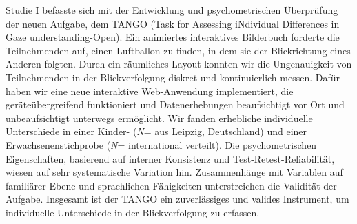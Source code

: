 \documentclass[
]{scrbook}
\begin{document}
Studie I befasste sich mit der Entwicklung und psychometrischen Überprüfung der neuen Aufgabe, dem TANGO (Task for Assessing iNdividual Differences in Gaze understanding-Open). Ein animiertes interaktives Bilderbuch forderte die Teilnehmenden auf, einen Luftballon zu finden, in dem sie der Blickrichtung eines Anderen folgten. Durch ein räumliches Layout konnten wir die Ungenauigkeit von Teilnehmenden in der Blickverfolgung diskret und kontinuierlich messen. Dafür haben wir eine neue interaktive Web-Anwendung implementiert, die geräteübergreifend funktioniert und Datenerhebungen beaufsichtigt vor Ort und unbeaufsichtigt unterwegs ermöglicht. Wir fanden erhebliche individuelle Unterschiede in einer Kinder- (\emph{N}\thinspace= aus Leipzig, Deutschland) und einer Erwachsenenstichprobe (\emph{N}\thinspace = international verteilt). Die psychometrischen Eigenschaften, basierend auf interner Konsistenz und Test-Retest-Reliabilität, wiesen auf sehr systematische Variation hin. Zusammenhänge mit Variablen auf familiärer Ebene und sprachlichen Fähigkeiten unterstreichen die Validität der Aufgabe. Insgesamt ist der TANGO ein zuverlässiges und valides Instrument, um individuelle Unterschiede in der Blickverfolgung zu erfassen.
\end{document}
